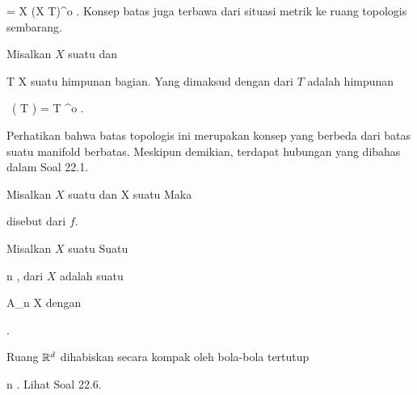 \mavergleichskettedisp
{\vergleichskette
{ 
}
{ =} { X \setminus (X \setminus T)^{o}
}
{ } {
}
{ } {
}
{ } {
}
}
{}{}{.}
Konsep batas juga terbawa dari situasi metrik ke ruang topologis sembarang.

{
}
{

Misalkan $X$ suatu
dan

\mavergleichskette
{\vergleichskette
{ T
}
{ \subseteq }{ X
}
{  }{
}
{    }{
}
{   }{
}
}
{}{}{}
suatu himpunan bagian. Yang dimaksud dengan
dari $T$ adalah himpunan

\mavergleichskettedisp
{\vergleichskette
{  \, ( T )
}
{ =} {   \setminus T ^{o}
}
{ } {
}
{ } {
}
{ } {
}
}
{}{}{.}

}
Perhatikan bahwa batas topologis ini merupakan konsep yang berbeda dari batas suatu manifold berbatas. Meskipun demikian, terdapat hubungan yang dibahas dalam
Soal 22.1.

{}
{

Misalkan $X$ suatu
dan
 { X } {\R
} {}
suatu
Maka

 {  }

disebut  dari $f$.

}

{}
{

Misalkan $X$ suatu
Suatu 

 {}
 {n \in \N} {}
 {} {} {} {,}
dari $X$ adalah suatu

\mavergleichskette
{\vergleichskette
{ A_n
}
{ \subseteq }{ X
}
{  }{
}
{    }{
}
{   }{
}
}
{}{}{}
dengan

 { . }

}

Ruang ${\mathbb R}^d$ dihabiskan secara kompak oleh bola-bola tertutup

 {}
 {n \in \N} {}
 {} {} {} {.}
Lihat
Soal 22.6.




